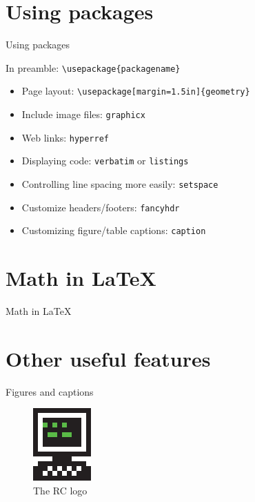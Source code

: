 \documentclass[xcolor={dvipsnames}]{beamer}
\begin{document}
\section{Using packages}
\begin{frame}{Using packages}
\begin{block}{}
\centering
In preamble: \texttt{\textbackslash usepackage\{packagename\}}
\end{block}
\begin{itemize}
\item Page layout: \texttt{\textbackslash usepackage[margin=1.5in]\{geometry\}}
\item Include image files: \texttt{graphicx}
\item Web links: \texttt{hyperref} 
\item Displaying code: \texttt{verbatim} or \texttt{listings}
\item Controlling line spacing more easily: \texttt{setspace}
\item Customize headers/footers: \texttt{fancyhdr}
\item Customizing figure/table captions: \texttt{caption}
\end{itemize}
\end{frame}

\section{Math in \LaTeX}
\begin{frame}{Math in \LaTeX}
\end{frame}

\section{Other useful features}
\begin{frame}{Figures and captions}

\begin{figure}
\includegraphics[scale=1.5]{rc-logo}
\caption{The RC logo}
\end{figure}
\end{frame}
\end{document}
